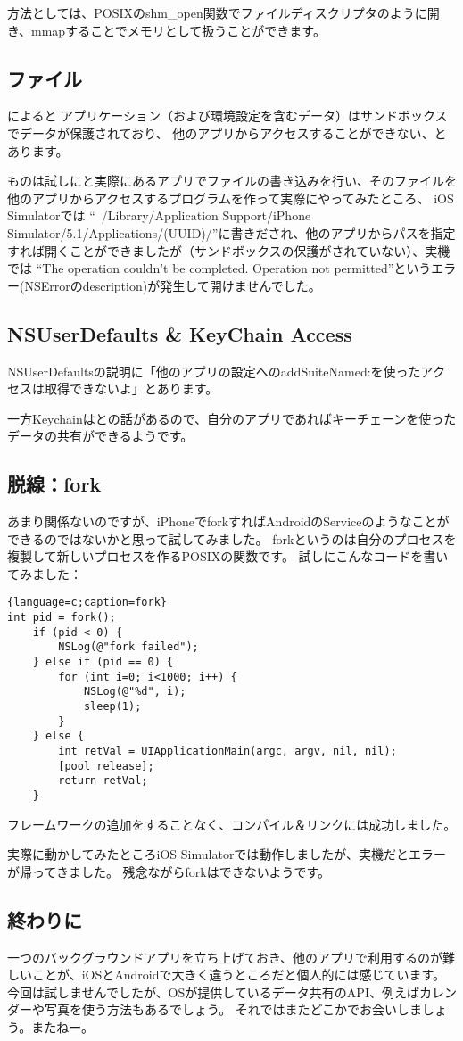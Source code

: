 方法としては、POSIXのshm\_open関数でファイルディスクリプタのように開き、mmapすることでメモリとして扱うことができます。

\subsection{ファイル}
によると
アプリケーション（および環境設定を含むデータ）はサンドボックスでデータが保護されており、
他のアプリからアクセスすることができない、とあります。

ものは試しにと実際にあるアプリでファイルの書き込みを行い、そのファイルを他のアプリからアクセスするプログラムを作って実際にやってみたところ、
iOS Simulatorでは
``~/Library/Application Support/iPhone Simulator/5.1/Applications/(UUID)/''に書きだされ、他のアプリからパスを指定すれば開くことができましたが（サンドボックスの保護がされていない）、実機では
``The operation couldn't be completed. Operation not permitted''というエラー(NSErrorのdescription)が発生して開けませんでした。

\subsection{NSUserDefaults \& KeyChain Access}
NSUserDefaultsの説明に「他のアプリの設定へのaddSuiteNamed:を使ったアクセスは取得できないよ」とあります。

一方Keychainはとの話があるので、自分のアプリであればキーチェーンを使ったデータの共有ができるようです。

\subsection{脱線：fork}
あまり関係ないのですが、iPhoneでforkすればAndroidのServiceのようなことができるのではないかと思って試してみました。
forkというのは自分のプロセスを複製して新しいプロセスを作るPOSIXの関数です。
試しにこんなコードを書いてみました：
\begin{lstlisting}{language=c;caption=fork}
int pid = fork();
	if (pid < 0) {
		NSLog(@"fork failed");
	} else if (pid == 0) {
		for (int i=0; i<1000; i++) {
			NSLog(@"%d", i);
			sleep(1);
		}
	} else {
		int retVal = UIApplicationMain(argc, argv, nil, nil);
		[pool release];
		return retVal;
	}
\end{lstlisting}
フレームワークの追加をすることなく、コンパイル＆リンクには成功しました。

実際に動かしてみたところiOS Simulatorでは動作しましたが、実機だとエラーが帰ってきました。
残念ながらforkはできないようです。

\subsection{終わりに}
一つのバックグラウンドアプリを立ち上げておき、他のアプリで利用するのが難しいことが、iOSとAndroidで大きく違うところだと個人的には感じています。
今回は試しませんでしたが、OSが提供しているデータ共有のAPI、例えばカレンダーや写真を使う方法もあるでしょう。
それではまたどこかでお会いしましょう。またねー。
